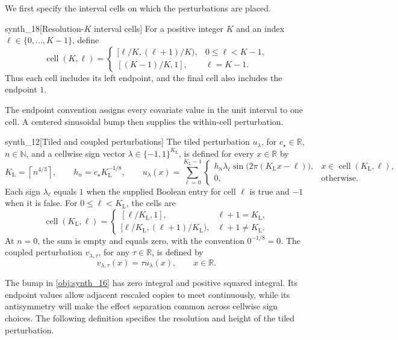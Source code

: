 \documentclass[11pt]{article}
\begin{document}
We first specify the interval cells on which the perturbations are placed.

\begin{definitionv}{synth_18}[Resolution-\(K\) interval cells]
For a positive integer \(K\) and an index \(\ell\in\{0,\ldots,K-1\}\), define
\[
\operatorname{cell}(K,\ell)=
\begin{cases}
[\ell/K,(\ell+1)/K),&0\le\ell<K-1,\\
[(K-1)/K,1],&\ell=K-1.
\end{cases}
\]
Thus each cell includes its left endpoint, and the final cell also includes the endpoint \(1\).
\end{definitionv}

The endpoint convention assigns every covariate value in the unit interval to one cell. A centered sinusoidal bump then supplies the within-cell perturbation.

\begin{definitionv}{synth_12}[Tiled and coupled perturbations]
The tiled perturbation \(u_{\lambda}\), for \(c_{\star}\in\mathbb R\), \(n\in\mathbb N\), and a cellwise sign vector \(\lambda\in\{-1,1\}^{K_{\mathrm L}}\), is defined for every \(x\in\mathbb R\) by
\[
K_{\mathrm L}=\left\lceil n^{4/3}\right\rceil,
\qquad
h_n=c_{\star}K_{\mathrm L}^{-1/8},
\qquad
u_{\lambda}(x)=
\sum_{\ell=0}^{K_{\mathrm L}-1}
\begin{cases}
h_n\lambda_\ell\sin\!\bigl(2\pi(K_{\mathrm L}x-\ell)\bigr),
& x\in\operatorname{cell}(K_{\mathrm L},\ell),\\
0,&\text{otherwise}.
\end{cases}
\]
Each sign \(\lambda_\ell\) equals \(1\) when the supplied Boolean entry for cell \(\ell\) is true and \(-1\) when it is false. For \(0\leq\ell<K_{\mathrm L}\), the cells are
\[
\operatorname{cell}(K_{\mathrm L},\ell)=
\begin{cases}
[\ell/K_{\mathrm L},1],
& \ell+1=K_{\mathrm L},\\
[\ell/K_{\mathrm L},(\ell+1)/K_{\mathrm L}),
& \ell+1\ne K_{\mathrm L}.
\end{cases}
\]
At \(n=0\), the sum is empty and equals zero, with the convention \(0^{-1/8}=0\).
The coupled perturbation \(v_{\lambda,\tau}\), for any \(\tau\in\mathbb R\), is defined by
\[
v_{\lambda,\tau}(x)=\tau u_{\lambda}(x),
\qquad x\in\mathbb R.
\]
\end{definitionv}

The bump  in \cref{obj:synth_16} has zero integral and positive squared integral. Its endpoint values allow adjacent rescaled copies to meet continuously, while its antisymmetry will make the effect separation common across cellwise sign choices. The following definition specifies the resolution and height of the tiled perturbation.
\end{document}
